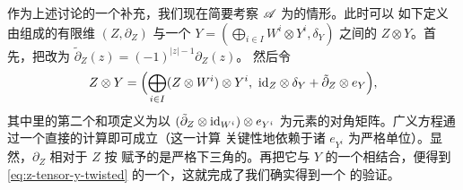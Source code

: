 作为上述讨论的一个补充，我们现在简要考察 $\mathscr{A}$ 为\trStrictlyUnital{}的情形。此时可以
如下定义由\trVectorSpace{}组成的有限维\trChainComplex{} $(Z,\partial_Z)$ 与一个%
\trTwistedComplex{} $Y=(\bigoplus_{i\in I}W^i\otimes Y^i,\delta_Y)$ 之间的\trTensorProduct{}%
$Z\otimes Y$。首先，把\trDifferential{}改为 $\tilde{\partial}_Z(z)=(-1)^{|z|-1}\partial_Z(z)$。
然后令
\begin{equation}\label{eq:z-tensor-y-twisted}
Z\otimes Y=\Bigl(\bigoplus_{i\in I}(Z\otimes W^i)\otimes Y^i,\ \id_Z\otimes\delta_Y
+\tilde{\partial}_Z\otimes e_Y\Bigr),
\end{equation}
其中\trDifferential{}里的第二个和项定义为以 $(\tilde{\partial}_Z\otimes\mathrm{id}_{W^i})\otimes e_{Y^i}$
为元素的对角矩阵。广义\trMaurerCartan{}方程通过一个直接的计算即可成立（这一计算
关键性地依赖于诸 $e_{Y^i}$ 为严格单位）。显然，$\partial_Z$ 相对于 $Z$ 按\trDegree{}%
赋予的\trFiltration{}是严格下三角的。再把它与 $Y$ 的一个\trFiltration{}相结合，便得到
\eqref{eq:z-tensor-y-twisted} 的一个\trFiltration，这就完成了我们确实得到一个%
\trTwistedComplex{}的验证。
